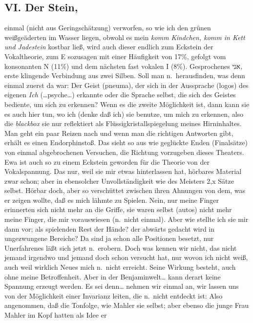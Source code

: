 \documentclass[
]{article}
\author{}
\date{\vspace{-2.5em}}
\begin{document}
\subsection{VI. Der Stein,}\label{vi.-der-stein}

einmal (nicht aus Geringschätzung) verworfen, so wie ich den grünen
weißgeäderten im Wasser liegen, obwohl es mein \emph{komm Kindchen, komm
in Kett\textquotesingle{} und Jadestein} kostbar ließ, wird auch dieser
endlich zum Eckstein der Vokaltheorie, zum E sozusagen mit einer
Häufigkeit von 17\%, gefolgt vom konsonanten N (11\%) und dem nächsten
fast vokalen I (8\%). Gesprochenes אני\emph{, }erste klingende
Verbindung aus zwei Silben. Soll man n.~herausfinden, was denn einmal
zuerst da war: Der Geist (pneuma), der sich in der Aussprache (logos)
des eigenen \emph{Ich} (\ldots psyche\ldots) erkannte oder die Sprache
selbst, die sich des Geistes bediente, um sich zu erkennen? Wenn es die
zweite Möglichkeit ist, dann kann sie es auch hier tun, wo ich (denke
daß ich) sie benutze, um mich zu erkennen, also die \emph{blackbox} sie
nur reflektiert als Flüssigkristallspiegelung meines Hirninhaltes. Man
geht ein paar Reizen nach und wenn man die richtigen Antworten gibt,
erhält es einen Endorphinstoß. Das sieht so aus wie geglückte Enden
(Finalsätze) von einmal abgebrochenen Versuchen, die Richtung vorzugeben
dieses Theaters. Ewa ist auch so zu einem Eckstein geworden für die
Theorie von der Vokalspannung. Das nur, weil sie mir etwas hinterlassen
hat, hörbares Material zwar schon; aber in ebensolcher Unvollständigkeit
wie des Meisters 2,x Sätze selbst. Hörbar doch, aber so verschüttet
zwischen ihren Ahnungen von dem, was er zeigen wollte, daß es mich
lähmte zu Spielen. Nein, nur meine Finger erinnerten sich nicht mehr an
die Griffe, sie waren selbst (autos) nicht mehr meine Finger, die mir
vorauswiesen (n.~nicht einmal). Aber wie stellte ich sie mir dann vor;
als spielenden Rest der Hände? der abwärts gedacht wird in ungezwungene
Bereiche? Da sind ja schon alle Positionen besetzt, nur Unerfahrenes
läßt sich jetzt n.~erobern. Doch was kennen wir nicht, das nicht jemand
irgendwo und jemand doch schon versucht hat, nur wovon ich nicht weiß,
auch weil wirklich Neues mich n.~nicht erreicht. Seine Wirkung besteht,
auch ohne meine Betroffenheit. Aber in der Benjaminwelt\ldots{} kann
derart keine Spannung erzeugt werden. Es sei denn\ldots{} nehmen wir
einmal an, wir lassen uns von der Möglichkeit einer Invarianz leiten,
die n.~nicht entdeckt ist: Also angenommen, daß die Tonfolge, wie Mahler
sie selbst; aber ebenso die junge Frau Mahler im Kopf hatten als Idee er
\end{document}
